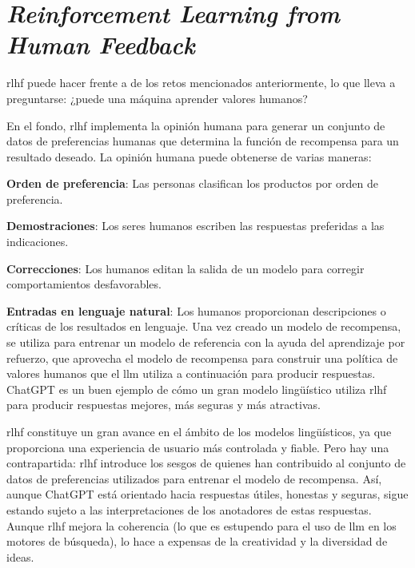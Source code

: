 \section{\textit{Reinforcement Learning from Human Feedback}}

\acrfull{rlhf} puede hacer frente a de los retos mencionados anteriormente, lo que  lleva a preguntarse: ¿puede una máquina aprender valores humanos?

En el fondo, \acrshort{rlhf} implementa la opinión humana para generar un conjunto de datos de preferencias humanas que determina la función de recompensa para un resultado deseado. La opinión humana puede obtenerse de varias maneras\cite{Tolaka}:

\begin{description}    

\item \textbf{Orden de preferencia}: Las personas clasifican los productos por orden de preferencia.

\item \textbf{Demostraciones}: Los seres humanos escriben las respuestas preferidas a las indicaciones.

\item \textbf{Correcciones}: Los humanos editan la salida de un modelo para corregir comportamientos desfavorables.

\item \textbf{Entradas en lenguaje natural}: Los humanos proporcionan descripciones o críticas de los resultados en lenguaje. Una vez creado un modelo de recompensa, se utiliza para entrenar un modelo de referencia con la ayuda del aprendizaje por refuerzo, que aprovecha el modelo de recompensa para construir una política de valores humanos que el \acrlong{llm} utiliza a continuación para producir respuestas. ChatGPT es un buen ejemplo de cómo un gran modelo lingüístico utiliza \acrshort{rlhf} para producir respuestas mejores, más seguras y más atractivas.

\end{description}

\acrshort{rlhf} constituye un gran avance en el ámbito de los modelos lingüísticos, ya que proporciona una experiencia de usuario más controlada y fiable. Pero hay una contrapartida: \acrshort{rlhf} introduce los sesgos de quienes han contribuido al conjunto de datos de preferencias utilizados para entrenar el modelo de recompensa. Así, aunque ChatGPT está orientado hacia respuestas útiles, honestas y seguras, sigue estando sujeto a las interpretaciones de los anotadores de estas respuestas. Aunque \acrshort{rlhf} mejora la coherencia (lo que es estupendo para el uso de \acrshort{llm} en los motores de búsqueda), lo hace a expensas de la creatividad y la diversidad de ideas.
